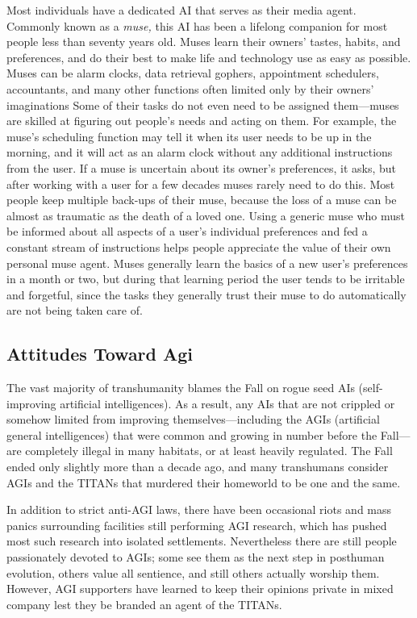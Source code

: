 Most individuals have a dedicated AI that serves as 
their media agent. Commonly known as a \textit{muse,} this 
AI has been a lifelong companion for most people 
less than seventy years old. Muses learn their owners' 
tastes, habits, and preferences, and do their best to 
make life and technology use as easy as possible. 
Muses can be alarm clocks, data retrieval gophers, 
appointment schedulers, accountants, and many other 
functions often limited only by their owners' imaginations
Some of their tasks do not even need to be assigned
them—muses are skilled at figuring out people's
needs and acting on them. For example, the muse's 
scheduling function may tell it when its user needs to 
be up in the morning, and it will act as an alarm clock 
without any additional instructions from the user. If a 
muse is uncertain about its owner's preferences, it asks, 
but after working with a user for a few decades muses 
rarely need to do this. Most people keep multiple 
back-ups of their muse, because the loss of a muse 
can be almost as traumatic as the death of a loved one. 
Using a generic muse who must be informed about 
all aspects of a user's individual preferences and fed a 
constant stream of instructions helps people appreciate
the value of their own personal muse agent. Muses
generally learn the basics of a new user's preferences 
in a month or two, but during that learning period the 
user tends to be irritable and forgetful, since the tasks 
they generally trust their muse to do automatically are 
not being taken care of.

\subsection{Attitudes Toward Agi}

The vast majority of transhumanity blames the Fall on 
rogue seed AIs (self-improving artificial intelligences). 
As a result, any AIs that are not crippled or somehow
limited from improving themselves—including
the AGIs (artificial general intelligences) that were 
common and growing in number before the Fall—are 
completely illegal in many habitats, or at least heavily 
regulated. The Fall ended only slightly more than a 
decade ago, and many transhumans consider AGIs 
and the TITANs that murdered their homeworld to 
be one and the same. 

In addition to strict anti-AGI laws, there have been 
occasional riots and mass panics surrounding facilities
still performing AGI research, which has pushed
most such research into isolated settlements. Nevertheless
there are still people passionately devoted to
AGIs; some see them as the next step in posthuman 
evolution, others value all sentience, and still others 
actually worship them. However, AGI supporters have 
learned to keep their opinions private in mixed company
lest they be branded an agent of the TITANs.

